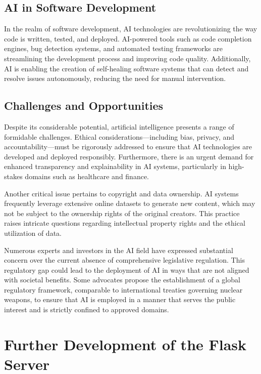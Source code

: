\subsection{AI in Software Development}

In the realm of software development, AI technologies are revolutionizing the way code is written, tested, and deployed. AI-powered tools such as code completion engines, bug detection systems, and automated testing frameworks are streamlining the development process and improving code quality. Additionally, AI is enabling the creation of self-healing software systems that can detect and resolve issues autonomously, reducing the need for manual intervention.

\subsection{Challenges and Opportunities}
\label{ref:challanges-and-opportunities}

Despite its considerable potential, artificial intelligence presents a range of formidable challenges. Ethical considerations—including bias, privacy, and accountability—must be rigorously addressed to ensure that AI technologies are developed and deployed responsibly. Furthermore, there is an urgent demand for enhanced transparency and explainability in AI systems, particularly in high-stakes domains such as healthcare and finance.

Another critical issue pertains to copyright and data ownership. AI systems frequently leverage extensive online datasets to generate new content, which may not be subject to the ownership rights of the original creators. This practice raises intricate questions regarding intellectual property rights and the ethical utilization of data.

Numerous experts and investors in the AI field have expressed substantial concern over the current absence of comprehensive legislative 
regulation. This regulatory gap could lead to the deployment of AI in ways that are not aligned with societal benefits. 
Some advocates propose the establishment of a global regulatory framework, comparable to international treaties governing 
nuclear weapons, to ensure that AI is employed in a manner that serves the public interest and is strictly confined to approved domains.
\cite{AI-Risk-Statement}


\section{Further Development of the Flask Server}

